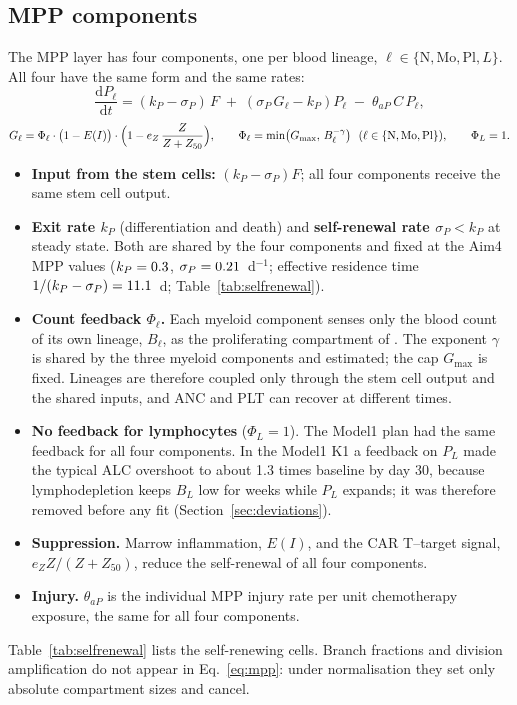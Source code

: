 \documentclass[11pt]{article}
\newcommand{\dd}{\mathrm{d}}
\begin{document}
\subsection{MPP components}\label{sec:mpp}
The MPP layer has four components, one per blood lineage, $\ell\in\{\mathrm{N},\mathrm{Mo},\mathrm{Pl},L\}$. All four have the same form and the same rates:
\begin{equation}
\frac{\dd P_\ell}{\dd t} = (k_P-\sigma_P)\,F \;+\; \left(\sigma_P\,G_\ell - k_P\right) P_\ell \;-\; \theta_{aP}\,C\,P_\ell, \label{eq:mpp}
\end{equation}
\begin{equation}
G_\ell = \Phi_\ell\cdot\bigl(1-E(I)\bigr)\cdot\Bigl(1-e_Z\,\frac{Z}{Z+Z_{50}}\Bigr),\qquad
\Phi_\ell=\min\bigl(G_{\max},\,B_\ell^{-\gamma}\bigr)\ \ (\ell\in\{\mathrm{N},\mathrm{Mo},\mathrm{Pl}\}),\qquad \Phi_L=1. \label{eq:G}
\end{equation}
\begin{itemize}
\item \textbf{Input from the stem cells:} $(k_P-\sigma_P)F$; all four components receive the same stem cell output.
\item \textbf{Exit rate $k_P$} (differentiation and death) and \textbf{self-renewal rate $\sigma_P<k_P$} at steady state. Both are shared by the four components and fixed at the Aim4 MPP values ($k_P=0.3$, $\sigma_P=0.21$~d$^{-1}$; effective residence time $1/(k_P-\sigma_P)=11.1$~d; Table~\ref{tab:selfrenewal}).
\item \textbf{Count feedback $\Phi_\ell$.} Each myeloid component senses only the blood count of its own lineage, $B_\ell$, as the proliferating compartment of \citet{friberg2002}. The exponent $\gamma$ is shared by the three myeloid components and estimated; the cap $G_{\max}$ is fixed. Lineages are therefore coupled only through the stem cell output and the shared inputs, and ANC and PLT can recover at different times.
\item \textbf{No feedback for lymphocytes} ($\Phi_L=1$). The Model1 plan had the same feedback for all four components. In the Model1 K1 a feedback on $P_L$ made the typical ALC overshoot to about 1.3 times baseline by day 30, because lymphodepletion keeps $B_L$ low for weeks while $P_L$ expands; it was therefore removed before any fit (Section~\ref{sec:deviations}).
\item \textbf{Suppression.} Marrow inflammation, $E(I)$, and the CAR T--target signal, $e_Z Z/(Z+Z_{50})$, reduce the self-renewal of all four components.
\item \textbf{Injury.} $\theta_{aP}$ is the individual MPP injury rate per unit chemotherapy exposure, the same for all four components.
\end{itemize}
Table~\ref{tab:selfrenewal} lists the self-renewing cells. Branch fractions and division amplification do not appear in Eq.~\ref{eq:mpp}: under normalisation they set only absolute compartment sizes and cancel.
\end{document}
